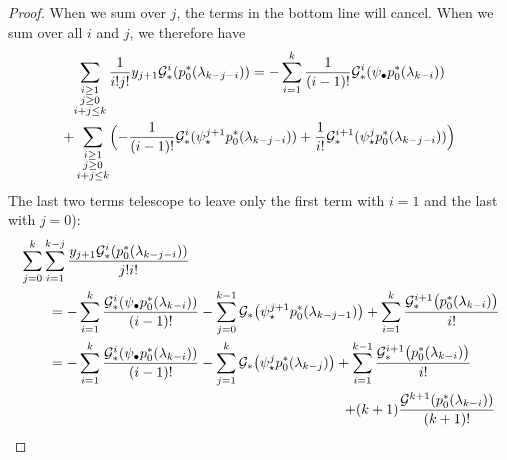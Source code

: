 \documentclass[12pt]{amsart}
\theoremstyle{definition}
\newcommand{\G}{\mathcal{G}}
\numberwithin{equation}{section}
\begin{document}
\begin{proof}
When we sum over $j$, the terms in the bottom line will cancel.  When we sum over all $i$ and $j$, we therefore have
\begin{multline*}
	\sum_{\substack{i\geq1 \\ j\geq 0 \\ i+j\leq k}} \frac{1}{i!j!} y_{j+1}\G^i_*(p_0^*(\lambda_{k-j-i})) 
 = - \sum_{i=1}^k \frac{1}{(i-1)!} \G^i_*(\psi_\bullet p_0^*(\lambda_{k-i})) \\
	+ \sum_{\substack{i\geq1 \\ j\geq 0 \\ i+j\leq k}} \Bigl( - \frac{1}{(i-1)!} \G_*^i(\psi_\star^{j+1}p_0^*(\lambda_{k-j-i})) + \frac{1}{i!} \G_*^{i+1}(\psi^j_\star p_0^*(\lambda_{k-j-i})) \Bigr)
\end{multline*}
The last two terms telescope to leave only the first term with $i= 1$ and the last with $j= 0$):
\begin{align}
	 \notag& \sum_{j=0}^k\sum_{i=1}^{k-j}\frac{y_{j+1}\G_*^{i}(p_0^*(\lambda_{k-j-i}))}{j!i!} 
	\\ \notag & \qquad =-\sum_{i=1}^k\frac{\G_*^i(\psi_\bullet p_0^*(\lambda_{k-i}))}{(i-1)!}
		-\sum_{j=0}^{k-1}\G_*\big(\psi_\star^{j+1}p_0^*(\lambda_{k-j-1})\big)
		+\sum_{i=1}^{k}\frac{\G^{i+1}_*\big(p_0^*(\lambda_{k-i})\big)}{i!}
	\\\label{eq:recursiontype3}  & \qquad=-\sum_{i=1}^k\frac{\G_*^i(\psi_\bullet p_0^*(\lambda_{k-i}))}{(i-1)!}
	-\sum_{j=1}^{k}\G_*\big(\psi_\star^{j}p_0^*(\lambda_{k-j})\big)
	+\sum_{i=1}^{k-1}\frac{\G^{i+1}_*\big(p_0^*(\lambda_{k-i})\big)}{i!} 
	\\ \notag
	& \omit\hfill $\displaystyle + (k+1) \frac{\G^{k+1}(p_0^*(\lambda_{k-i}))}{(k+1)!}$
\end{align}


\end{proof}
\end{document}
